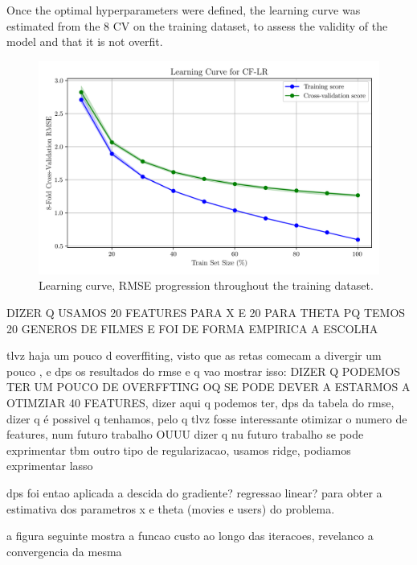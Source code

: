 \documentclass[conference]{IEEEtran}
\begin{document}
Once the optimal hyperparameters were defined, the learning curve was estimated from the 8 CV on the training dataset, to assess the validity of the model and that it is not overfit.

\begin{figure}[H]
    \centering
    \includegraphics[width=1\linewidth]{assets/model01_learning_curve.png}
    \caption{Learning curve, RMSE progression throughout the training dataset.}
    \label{fig:model01_cost_function}
\end{figure}

DIZER Q USAMOS 20 FEATURES PARA X E 20 PARA THETA PQ TEMOS 20 GENEROS DE FILMES E FOI DE FORMA EMPIRICA A ESCOLHA

tlvz haja um pouco d eoverffiting, visto que as retas comecam a divergir um pouco , e dps os resultados do rmse e q vao mostrar isso: DIZER Q PODEMOS TER UM POUCO DE OVERFFTING OQ SE PODE DEVER A ESTARMOS A OTIMZIAR 40 FEATURES, dizer aqui q podemos ter, dps da tabela do rmse, dizer q é possivel q tenhamos, pelo q tlvz fosse interessante otimizar o numero de features, num futuro trabalho OUUU dizer q nu futuro trabalho se pode exprimentar tbm outro tipo de regularizacao, usamos ridge, podiamos exprimentar lasso

dps foi entao aplicada a descida do gradiente? regressao linear? para obter a estimativa dos parametros x e theta (movies e users) do problema.

a figura seguinte mostra a funcao custo ao longo das iteracoes, revelanco a convergencia da mesma
\end{document}
